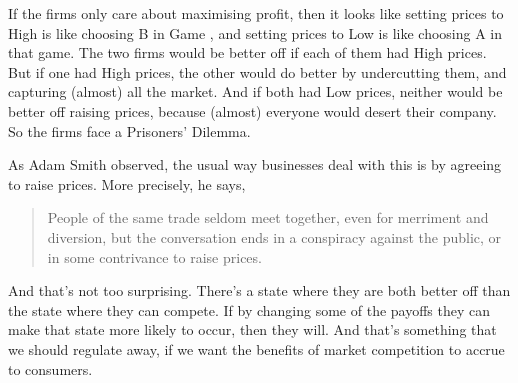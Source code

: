 If the firms only care about maximising profit, then it looks like setting prices to High is like choosing B in Game , and setting prices to Low is like choosing A in that game. The two firms would be better off if each of them had High prices. But if one had High prices, the other would do better by undercutting them, and capturing (almost) all the market. And if both had Low prices, neither would be better off raising prices, because (almost) everyone would desert their company. So the firms face a Prisoners' Dilemma.

As Adam Smith observed, the usual way businesses deal with this is by agreeing to raise prices. More precisely, he says,

\begin{quote}
People of the same trade seldom meet together, even for merriment and diversion, but the conversation ends in a conspiracy against the public, or in some contrivance to raise prices.
\end{quote}

\noindent And that's not too surprising. There's a state where they are both better off than the state where they can compete. If by changing some of the payoffs they can make that state more likely to occur, then they will. And that's something that we should regulate away, if we want the benefits of market competition to accrue to consumers.

